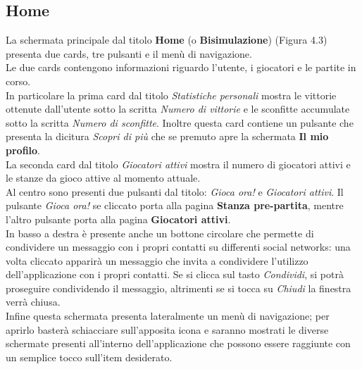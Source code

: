 \documentclass[a4paper,11pt,twoside,openright]{report}
\begin{document}
\subsection{Home}
La schermata principale dal titolo \textbf{Home} (o \textbf{Bisimulazione}) (Figura 4.3) presenta due cards, tre pulsanti e il menù di navigazione.\\
Le due cards contengono informazioni riguardo l'utente, i giocatori e le partite in corso.\\ 
In particolare la prima card dal titolo \textit{Statistiche personali}  mostra le vittorie ottenute dall'utente sotto la scritta \textit{Numero di vittorie} e le sconfitte 
accumulate sotto la scritta \textit{Numero di sconfitte}. Inoltre questa card contiene un pulsante che presenta la dicitura \textit{Scopri di più} che se premuto apre la
schermata \textbf{Il mio profilo}.\\
La seconda card dal titolo \textit{Giocatori attivi} mostra il numero di giocatori attivi e le stanze da gioco attive al momento attuale.\\
Al centro sono presenti due pulsanti dal titolo: \textit{Gioca ora!} e \textit{Giocatori attivi}. Il pulsante \textit{Gioca ora!} se cliccato porta alla pagina
\textbf{Stanza pre-partita}, mentre l'altro pulsante porta alla pagina \textbf{Giocatori attivi}.\\
In basso a destra è presente anche un bottone circolare che permette di condividere un messaggio con i propri contatti su differenti social networks: una volta cliccato
apparirà un messaggio che invita a condividere l'utilizzo dell'applicazione con i propri contatti. Se si clicca sul tasto \textit{Condividi}, si potrà proseguire condividendo
il messaggio, altrimenti se si tocca su \textit{Chiudi} la finestra verrà chiusa.\\
Infine questa schermata presenta lateralmente un menù di navigazione; per aprirlo basterà schiacciare sull'apposita icona e saranno mostrati le diverse schermate
presenti all'interno dell'applicazione che possono essere raggiunte con un semplice tocco sull'item desiderato.
\end{document}
